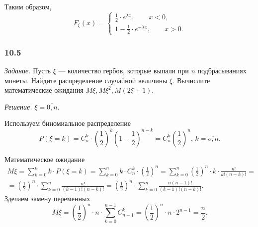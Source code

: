 Таким образом,
$$F_{ \xi } \left( x \right) =
\begin{cases}
\frac{1}{2} \cdot e^{ \lambda x}, \qquad x < 0, \\
1 - \frac{1}{2} \cdot e^{- \lambda x}, \qquad x > 0.
\end{cases}$$

\subsubsection*{10.5}

\textit{Задание.} Пусть $ \xi $ --- количество гербов, которые выпали при $n$ подбрасываниях монеты.
Найдите распределение случайной величины $ \xi $.
Вычислите математические ожидания $M \xi, M \xi^2, M \left( 2 \xi + 1 \right) $.

\textit{Решение.} $ \xi = \overline{0, n}$.

Используем биномиальное распределение
$$P \left( \xi = k \right) =
C_n^k \cdot \left( \frac{1}{2} \right)^k \left( 1 - \frac{1}{2} \right)^{n-k} =
C_n^k \left( \frac{1}{2} \right)^n, \,
k = \overline{o, n}.$$

Математическое ожидание
\begin{equation*}
\begin{split}
M \xi =
\sum \limits_{k=0}^n k \cdot P \left( \xi = k \right) =
\sum \limits_{k=0}^n k \cdot C_n^k \cdot \left( \frac{1}{2} \right)^n =
\sum \limits_{k=0}^n \left( \frac{1}{2} \right)^n \cdot k \cdot \frac{n!}{k! \left( n-k \right)!} = \\
= \left( \frac{1}{2} \right)^n \cdot \sum \limits_{k=0}^n \frac{n!}{ \left( k - 1 \right)! \left( n - k \right)!} =
\left( \frac{1}{2} \right)^n \cdot \sum \limits_{k=0}^n \frac{n \left( n-1 \right)!}{ \left( k-1 \right)! \left( n-k \right)!}.
\end{split}
\end{equation*}
Зделаем замену переменных
$$M \xi =
\left( \frac{1}{2} \right)^n \cdot n \cdot \sum \limits_{k=0}^{n-1} C_{n-1}^k =
\left( \frac{1}{2} \right)^n \cdot n \cdot 2^{n-1} =
\frac{n}{2}.$$

